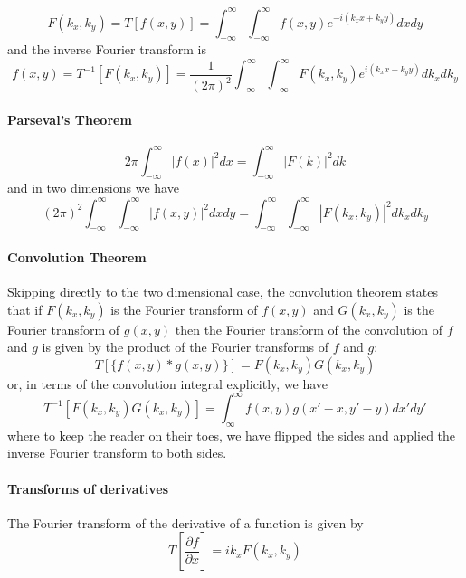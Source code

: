 \documentclass[../../main.tex]{subfiles} %
\begin{document}
\begin{equation}\label{eq. Fourier transform 2D}
    F(k_x,k_y)=T[f(x,y)]=\int_{-\infty}^\infty\int_{-\infty}^\infty f(x,y)e^{-i(k_xx+k_yy)}dxdy
\end{equation}
and the inverse Fourier transform is
\begin{equation}
    f(x,y)=T^{-1}[F(k_x,k_y)]=\frac{1}{(2\pi)^2}\int_{-\infty}^\infty\int_{-\infty}^\infty F(k_x,k_y)e^{i(k_xx+k_yy)}dk_xdk_y
\end{equation}

\paragraph{Parseval's Theorem}
\begin{equation}
    2\pi \int_{-\infty}^\infty |f(x)|^2dx=\int_{-\infty}^\infty |F(k)|^2dk
\end{equation}
and in two dimensions we have 
\begin{equation}
    (2\pi)^2 \int_{-\infty}^\infty\int_{-\infty}^\infty |f(x,y)|^2dxdy=\int_{-\infty}^\infty\int_{-\infty}^\infty |F(k_x,k_y)|^2dk_xdk_y
\end{equation}

\paragraph{Convolution Theorem}
Skipping directly to the two dimensional case, the convolution theorem states that if $F(k_x,k_y)$ is the Fourier transform of $f(x,y)$ and $G(k_x,k_y)$ is the Fourier transform of $g(x,y)$ then the Fourier transform of the convolution of $f$ and $g$ is given by the product of the Fourier transforms of $f$ and $g$:
\begin{equation}
    T[\{f(x,y)*g(x,y)\}]=F(k_x,k_y)G(k_x,k_y)
\end{equation}
or, in terms of the convolution integral explicitly, we have
\begin{equation}
    T^{-1}[F(k_x,k_y)G(k_x,k_y)]=\int_\infty^\infty f(x,y)g(x'-x,y'-y)dx'dy'
\end{equation}
where to keep the reader on their toes, we have flipped the sides and applied the inverse Fourier transform to both sides.

\paragraph{Transforms of derivatives}
The Fourier transform of the derivative of a function is given by
\begin{equation}
    T\left[\frac{\partial f}{\partial x}\right]=ik_xF(k_x,k_y)
\end{equation}
\end{document}
